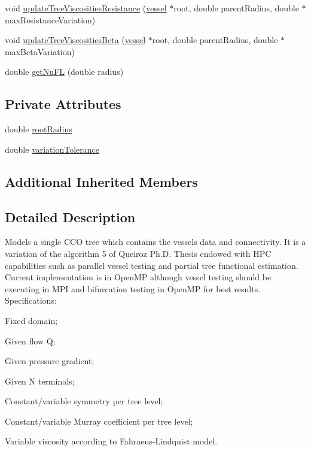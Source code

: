 \begin{DoxyCompactItemize}
\item 
void \mbox{\hyperlink{class_fi_ra_ro_va_vi_opt_c_c_o_tree_a50eebc27754469669334de13e35b12d8}{update\+Tree\+Viscosities\+Resistance}} (\mbox{\hyperlink{structvessel}{vessel}} $\ast$root, double parent\+Radius, double $\ast$max\+Resistance\+Variation)
\item 
void \mbox{\hyperlink{class_fi_ra_ro_va_vi_opt_c_c_o_tree_a52979a09656d9a35d340702e54d0863e}{update\+Tree\+Viscosities\+Beta}} (\mbox{\hyperlink{structvessel}{vessel}} $\ast$root, double parent\+Radius, double $\ast$max\+Beta\+Variation)
\item 
double \mbox{\hyperlink{class_fi_ra_ro_va_vi_opt_c_c_o_tree_aa328ee2b5ea32e0e0064d4324a165e95}{get\+Nu\+FL}} (double radius)
\end{DoxyCompactItemize}
\subsection*{Private Attributes}
\begin{DoxyCompactItemize}
\item 
double \mbox{\hyperlink{class_fi_ra_ro_va_vi_opt_c_c_o_tree_a6774c4c4a44bfc656321922c0d8cf5c3}{root\+Radius}}
\item 
double \mbox{\hyperlink{class_fi_ra_ro_va_vi_opt_c_c_o_tree_a78be49c68bbe3604b8ca309eb077d879}{variation\+Tolerance}}
\end{DoxyCompactItemize}
\subsection*{Additional Inherited Members}


\subsection{Detailed Description}
Models a single C\+CO tree which contains the vessel\textquotesingle{}s data and connectivity. It is a variation of the algorithm 5 of Queiroz Ph.\+D. Thesis endowed with H\+PC capabilities such as parallel vessel testing and partial tree functional estimation. Current implementation is in Open\+MP although vessel testing should be executing in M\+PI and bifurcation testing in Open\+MP for best results. Specifications\+:
\begin{DoxyItemize}
\item Fixed domain;
\item Given flow Q;
\item Given pressure gradient;
\item Given N terminals;
\item Constant/variable symmetry per tree level;
\item Constant/variable Murray coefficient per tree level;
\item Variable viscosity according to Fahraeus-\/\+Lindquist model. 
\end{DoxyItemize}

